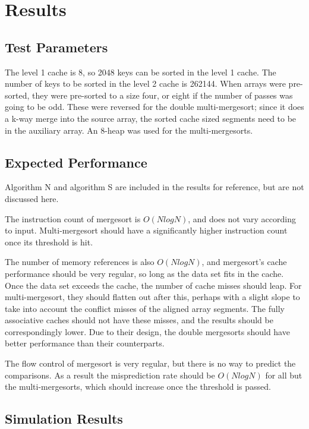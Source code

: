 \section{Results}
\subsection{Test Parameters}
The level 1 cache is 8, so 2048 keys can be sorted in the level 1 cache.
The number of keys to be sorted in the level 2 cache is 262144.  When arrays
were pre-sorted, they were pre-sorted to a size four, or eight if the number of passes
was going to be odd. These were reversed for the double multi-mergesort; since
it does a k-way merge into the source array, the sorted cache sized segments
need to be in the auxiliary array. An 8-heap was used for the multi-mergesorts.

\subsection{Expected Performance}

Algorithm N and algorithm S are included in the results for reference, but are
not discussed here.

The instruction count of mergesort is $O(NlogN)$, and does not vary
according to input. Multi-mergesort should have a significantly higher
instruction count once its threshold is hit.

The number of memory references is also $O(NlogN)$, and mergesort's cache
performance should be very regular, so long as the data set fits in the cache. Once
the data set exceeds the cache, the number of cache misses should leap. For
multi-mergesort, they should flatten out after this, perhaps with a slight
slope to take into account the conflict misses of the aligned array segments. The
fully associative caches should not have these misses, and the results should be
correspondingly lower. Due to their design, the double mergesorts should have
better performance than their counterparts.

The flow control of mergesort is very regular, but there is no way to predict
the comparisons. As a result the misprediction rate should be $O(NlogN)$ for
all but the multi-mergesorts, which should increase once the threshold is
passed.

\subsection{Simulation Results}
\label{Mergesort results}

